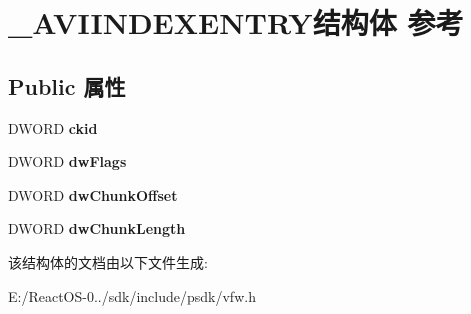 \hypertarget{struct___a_v_i_i_n_d_e_x_e_n_t_r_y}{}\section{\+\_\+\+A\+V\+I\+I\+N\+D\+E\+X\+E\+N\+T\+R\+Y结构体 参考}
\label{struct___a_v_i_i_n_d_e_x_e_n_t_r_y}
\subsection*{Public 属性}
\begin{DoxyCompactItemize}
\item 
\mbox{\label{struct___a_v_i_i_n_d_e_x_e_n_t_r_y_ac46fccbac1c1750f9a71ebff585f2209}} 
D\+W\+O\+RD {\bfseries ckid}
\item 
\mbox{\label{struct___a_v_i_i_n_d_e_x_e_n_t_r_y_ad54f09f7d37ddcf7ef8c1c0cabb7bb9d}} 
D\+W\+O\+RD {\bfseries dw\+Flags}
\item 
\mbox{\label{struct___a_v_i_i_n_d_e_x_e_n_t_r_y_aa9a776ab4905d5646b0df5ea687c1e82}} 
D\+W\+O\+RD {\bfseries dw\+Chunk\+Offset}
\item 
\mbox{\label{struct___a_v_i_i_n_d_e_x_e_n_t_r_y_a95499c675194fc589210e18a792dd92e}} 
D\+W\+O\+RD {\bfseries dw\+Chunk\+Length}
\end{DoxyCompactItemize}


该结构体的文档由以下文件生成\+:\begin{DoxyCompactItemize}
\item 
E\+:/\+React\+O\+S-\/0../sdk/include/psdk/vfw.\+h\end{DoxyCompactItemize}
